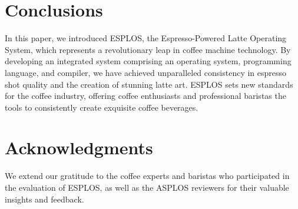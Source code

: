 \documentclass[nonacm,sigplan]{acmart}
\begin{document}
\section{Conclusions}
In this paper, we introduced ESPLOS, the Espresso-Powered Latte Operating System, which represents a revolutionary leap in coffee machine technology. By developing an integrated system comprising an operating system, programming language, and compiler, we have achieved unparalleled consistency in espresso shot quality and the creation of stunning latte art. ESPLOS sets new standards for the coffee industry, offering coffee enthusiasts and professional baristas the tools to consistently create exquisite coffee beverages.

\section{Acknowledgments}
We extend our gratitude to the coffee experts and baristas who participated in the evaluation of ESPLOS, as well as the ASPLOS reviewers for their valuable insights and feedback.



\end{document}
